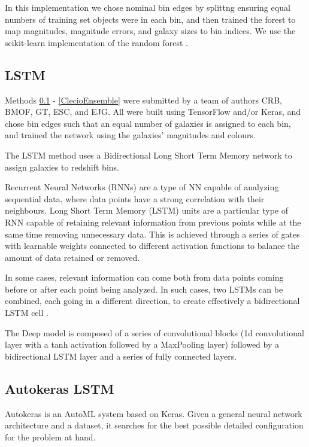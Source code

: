 \documentclass[twocolumn,twocolappendix]{aastex63}
\begin{document}
In this implementation we chose nominal bin edges by splittng ensuring equal numbers of training set 
objects were in each bin, and then trained the forest to map magnitudes, magnitude errors, and
galaxy sizes to bin indices.  We use the {\sc scikit-learn} implementation of the random forest
\citep{scikit-learn}.


\subsection{ {\sc LSTM} } 
\label{ClecioLSTM} 
Methods \ref{ClecioLSTM} - \ref{ClecioEnsemble} were
submitted by a team of authors CRB, BMOF, GT, ESC, and EJG.  All were built using TensorFlow and/or Keras, and
chose bin edges such that an equal number of galaxies is assigned to each bin, and trained the
network using the galaxies' magnitudes and colours. 

The LSTM method uses a Bidirectional Long Short Term Memory network to assign galaxies to redshift
bins.
 
Recurrent Neural Networks (RNNs) \citep{schuster, medsker, pascanu} are a type of NN capable of
analyzing sequential data, where data points have a strong correlation with their neighbours. Long
Short Term Memory (LSTM) units are a particular type of RNN capable of retaining relevant
information from previous points while at the same time removing unnecessary data. This is achieved
through a series of gates with learnable weights connected to different activation functions to
balance the amount of data retained or removed.
 
In some cases, relevant information can come both from data points coming before or after each point
being analyzed. In such cases, two LSTMs can be combined, each going in a different direction, to
create effectively a bidirectional LSTM cell \citep{schuster}.
 
The Deep model is composed of a series of convolutional blocks (1d
convolutional layer with a tanh activation followed by a MaxPooling layer) followed by a
bidirectional LSTM layer and a series of fully connected layers. 

\subsection{ {\sc Autokeras LSTM}}
Autokeras \citep{autokeras} is an AutoML system based on Keras. Given a general neural network
architecture and a dataset, it searches for the best possible detailed configuration for the problem
at hand. 
 
\end{document}
